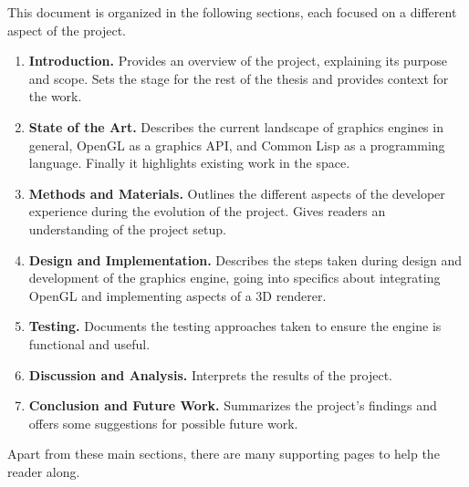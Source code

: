 This document is organized in the following sections, each focused on a different aspect of the project.

\begin{enumerate}
  \item \textbf{Introduction.} Provides an overview of the project, explaining its purpose and scope. Sets the stage for the rest of the thesis and provides context for the work.
  \item \textbf{State of the Art.} Describes the current landscape of graphics engines in general, OpenGL as a graphics API, and Common Lisp as a programming language. Finally it highlights existing work in the space.
  \item \textbf{Methods and Materials.} Outlines the different aspects of the developer experience during the evolution of the project. Gives readers an understanding of the project setup.
  \item \textbf{Design and Implementation.} Describes the steps taken during design and development of the graphics engine, going into specifics about integrating OpenGL and implementing aspects of a 3D renderer.
  \item \textbf{Testing.} Documents the testing approaches taken to ensure the engine is functional and useful.
  \item \textbf{Discussion and Analysis.} Interprets the results of the project.
  \item \textbf{Conclusion and Future Work.} Summarizes the project's findings and offers some suggestions for possible future work.
\end{enumerate}

Apart from these main sections,
there are many supporting pages to help the reader along.
